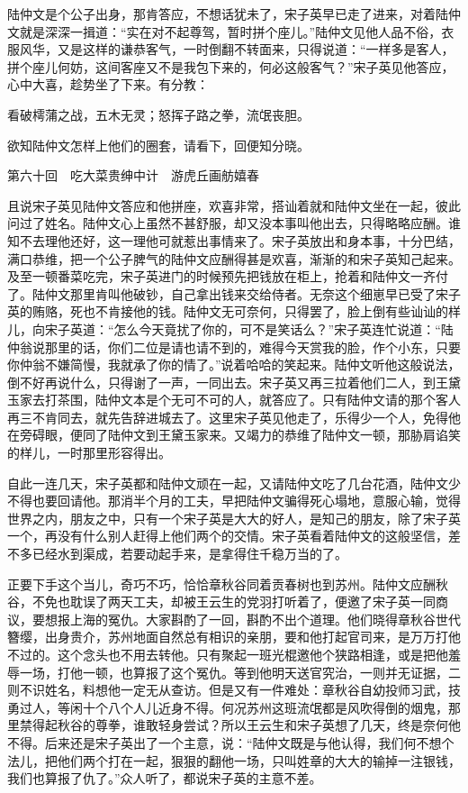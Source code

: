 \documentclass[12pt,UTF8]{ctexbook}
\begin{document}
{{{陆仲文是个公子出身，那肯答应，不想话犹未了，宋子英早已走了进来，对着陆仲文就是深深一揖道：“实在对不起尊驾，暂时拼个座儿。”陆仲文见他人品不俗，衣服风华，又是这样的谦恭客气，一时倒翻不转面来，只得说道：“一样多是客人，拼个座儿何妨，这间客座又不是我包下来的，何必这般客气？”宋子英见他答应，心中大喜，趁势坐了下来。有分教：

看破樗蒲之战，五木无灵；怒挥子路之拳，流氓丧胆。

欲知陆仲文怎样上他们的圈套，请看下，回便知分晓。





第六十回　吃大菜贵绅中计　游虎丘画舫嬉春





且说宋子英见陆仲文答应和他拼座，欢喜非常，搭讪着就和陆仲文坐在一起，彼此问过了姓名。陆仲文心上虽然不甚舒服，却又没本事叫他出去，只得略略应酬。谁知不去理他还好，这一理他可就惹出事情来了。宋子英放出和身本事，十分巴结，满口恭维，把一个公子脾气的陆仲文应酬得甚是欢喜，渐渐的和宋子英知己起来。及至一顿番菜吃完，宋子英进门的时候预先把钱放在柜上，抢着和陆仲文一齐付了。陆仲文那里肯叫他破钞，自己拿出钱来交给侍者。无奈这个细崽早已受了宋子英的贿赂，死也不肯接他的钱。陆仲文无可奈何，只得罢了，脸上倒有些讪讪的样儿，向宋子英道：“怎么今天竟扰了你的，可不是笑话么？”宋子英连忙说道：“陆仲翁说那里的话，你们二位是请也请不到的，难得今天赏我的脸，作个小东，只要你仲翁不嫌简慢，我就承了你的情了。”说着哈哈的笑起来。陆仲文听他这般说法，倒不好再说什么，只得谢了一声，一同出去。宋子英又再三拉着他们二人，到王黛玉家去打茶围，陆仲文本是个无可不可的人，就答应了。只有陆仲文请的那个客人再三不肯同去，就先告辞进城去了。这里宋子英见他走了，乐得少一个人，免得他在旁碍眼，便同了陆仲文到王黛玉家来。又竭力的恭维了陆仲文一顿，那胁肩谄笑的样儿，一时那里形容得出。

自此一连几天，宋子英都和陆仲文顽在一起，又请陆仲文吃了几台花酒，陆仲文少不得也要回请他。那消半个月的工夫，早把陆仲文骗得死心塌地，意服心输，觉得世界之内，朋友之中，只有一个宋子英是大大的好人，是知己的朋友，除了宋子英一个，再没有什么别人赶得上他们两个的交情。宋子英看着陆仲文的这般坚信，差不多已经水到渠成，若要动起手来，是拿得住千稳万当的了。

正要下手这个当儿，奇巧不巧，恰恰章秋谷同着贡春树也到苏州。陆仲文应酬秋谷，不免也耽误了两天工夫，却被王云生的党羽打听着了，便邀了宋子英一同商议，要想报上海的冤仇。大家斟酌了一回，斟酌不出个道理。他们晓得章秋谷世代簪缨，出身贵介，苏州地面自然总有相识的亲朋，要和他打起官司来，是万万打他不过的。这个念头也不用去转他。只有聚起一班光棍邀他个狭路相逢，或是把他羞辱一场，打他一顿，也算报了这个冤仇。等到他明天送官究治，一则并无证据，二则不识姓名，料想他一定无从查访。但是又有一件难处：章秋谷自幼投师习武，技勇过人，等闲十个八个人儿近身不得。何况苏州这班流氓都是风吹得倒的烟鬼，那里禁得起秋谷的尊拳，谁敢轻身尝试？所以王云生和宋子英想了几天，终是奈何他不得。后来还是宋子英出了一个主意，说：“陆仲文既是与他认得，我们何不想个法儿，把他们两个打在一起，狠狠的翻他一场，只叫姓章的大大的输掉一注银钱，我们也算报了仇了。”众人听了，都说宋子英的主意不差。

}}}
\end{document}

